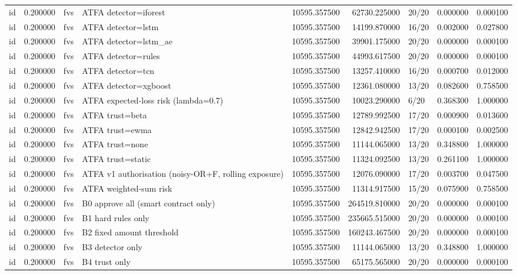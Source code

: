 \begin{tabular}{lrllrrlrr}
id & 0.200000 & fvs & ATFA detector=iforest & 10595.357500 & 62730.225000 & 20/20 & 0.000000 & 0.000100 \\
id & 0.200000 & fvs & ATFA detector=lstm & 10595.357500 & 14199.870000 & 16/20 & 0.002000 & 0.027800 \\
id & 0.200000 & fvs & ATFA detector=lstm\_ae & 10595.357500 & 39901.175000 & 20/20 & 0.000000 & 0.000100 \\
id & 0.200000 & fvs & ATFA detector=rules & 10595.357500 & 44993.617500 & 20/20 & 0.000000 & 0.000100 \\
id & 0.200000 & fvs & ATFA detector=tcn & 10595.357500 & 13257.410000 & 16/20 & 0.000700 & 0.012000 \\
id & 0.200000 & fvs & ATFA detector=xgboost & 10595.357500 & 12361.080000 & 13/20 & 0.082600 & 0.758500 \\
id & 0.200000 & fvs & ATFA expected-loss risk (lambda=0.7) & 10595.357500 & 10023.290000 & 6/20 & 0.368300 & 1.000000 \\
id & 0.200000 & fvs & ATFA trust=beta & 10595.357500 & 12789.992500 & 17/20 & 0.000900 & 0.013600 \\
id & 0.200000 & fvs & ATFA trust=ewma & 10595.357500 & 12842.942500 & 17/20 & 0.000100 & 0.002500 \\
id & 0.200000 & fvs & ATFA trust=none & 10595.357500 & 11144.065000 & 13/20 & 0.348800 & 1.000000 \\
id & 0.200000 & fvs & ATFA trust=static & 10595.357500 & 11324.092500 & 13/20 & 0.261100 & 1.000000 \\
id & 0.200000 & fvs & ATFA v1 authorisation (noisy-OR+F, rolling exposure) & 10595.357500 & 12076.090000 & 17/20 & 0.003700 & 0.047500 \\
id & 0.200000 & fvs & ATFA weighted-sum risk & 10595.357500 & 11314.917500 & 15/20 & 0.075900 & 0.758500 \\
id & 0.200000 & fvs & B0 approve all (smart contract only) & 10595.357500 & 264519.810000 & 20/20 & 0.000000 & 0.000100 \\
id & 0.200000 & fvs & B1 hard rules only & 10595.357500 & 235665.515000 & 20/20 & 0.000000 & 0.000100 \\
id & 0.200000 & fvs & B2 fixed amount threshold & 10595.357500 & 160243.467500 & 20/20 & 0.000000 & 0.000100 \\
id & 0.200000 & fvs & B3 detector only & 10595.357500 & 11144.065000 & 13/20 & 0.348800 & 1.000000 \\
id & 0.200000 & fvs & B4 trust only & 10595.357500 & 65175.565000 & 20/20 & 0.000000 & 0.000100 \\

\end{tabular}

